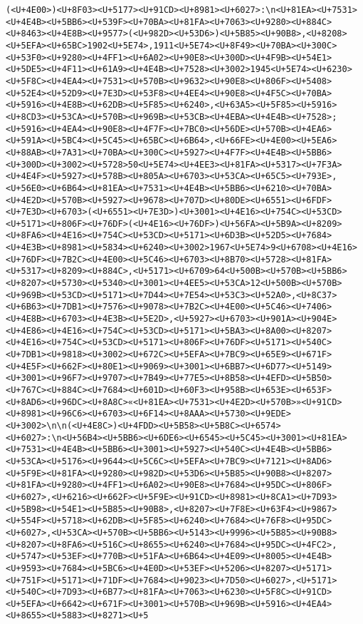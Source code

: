 \documentclass[
]{article}
\begin{document}
\begin{verbatim}
(<U+4E00>)<U+8F03><U+5177><U+91CD><U+8981><U+6027>:\n<U+81EA><U+7531><U+4E4B><U+5BB6><U+539F><U+70BA><U+81FA><U+7063><U+9280><U+884C><U+8463><U+4E8B><U+9577>(<U+982D><U+53D6>)<U+5B85><U+90B8>,<U+8208><U+5EFA><U+65BC>1902<U+5E74>,1911<U+5E74><U+8F49><U+70BA><U+300C><U+53F0><U+9280><U+4FF1><U+6A02><U+90E8><U+300D><U+4F9B><U+54E1><U+5DE5><U+4F11><U+61A9><U+4E4B><U+7528><U+3002>1945<U+5E74><U+6230><U+5F8C><U+4EA4><U+7531><U+570B><U+9632><U+90E8><U+806F><U+5408><U+52E4><U+52D9><U+7E3D><U+53F8><U+4EE4><U+90E8><U+4F5C><U+70BA><U+5916><U+4E8B><U+62DB><U+5F85><U+6240>,<U+63A5><U+5F85><U+5916><U+8CD3><U+53CA><U+570B><U+969B><U+53CB><U+4EBA><U+4E4B><U+7528>;<U+5916><U+4EA4><U+90E8><U+4F7F><U+7BC0><U+56DE><U+570B><U+4EA6><U+591A><U+5BC4><U+5C45><U+65BC><U+6B64>,<U+66FE><U+4E00><U+5EA6><U+88AB><U+7A31><U+70BA><U+300C><U+5927><U+4F7F><U+4E4B><U+5BB6><U+300D><U+3002><U+5728>50<U+5E74><U+4EE3><U+81FA><U+5317><U+7F3A><U+4E4F><U+5927><U+578B><U+805A><U+6703><U+53CA><U+65C5><U+793E>,<U+56E0><U+6B64><U+81EA><U+7531><U+4E4B><U+5BB6><U+6210><U+70BA><U+4E2D><U+570B><U+5927><U+9678><U+707D><U+80DE><U+6551><U+6FDF><U+7E3D><U+6703>(<U+6551><U+7E3D>)<U+3001><U+4E16><U+754C><U+53CD><U+5171><U+806F><U+76DF>(<U+4E16><U+76DF>)<U+56FA><U+5B9A><U+8209><U+8FA6><U+4E16><U+754C><U+53CD><U+5171><U+6D3B><U+52D5><U+7684><U+4E3B><U+8981><U+5834><U+6240><U+3002>1967<U+5E74>9<U+6708><U+4E16><U+76DF><U+7B2C><U+4E00><U+5C46><U+6703><U+8B70><U+5728><U+81FA><U+5317><U+8209><U+884C>,<U+5171><U+6709>64<U+500B><U+570B><U+5BB6><U+8207><U+5730><U+5340><U+3001><U+4EE5><U+53CA>12<U+500B><U+570B><U+969B><U+53CD><U+5171><U+7D44><U+7E54><U+53C3><U+52A0>,<U+8C37><U+6B63><U+7DB1><U+7576><U+9078><U+7B2C><U+4E00><U+5C46><U+7406><U+4E8B><U+6703><U+4E3B><U+5E2D>,<U+5927><U+6703><U+901A><U+904E><U+4E86><U+4E16><U+754C><U+53CD><U+5171><U+5BA3><U+8A00><U+8207><U+4E16><U+754C><U+53CD><U+5171><U+806F><U+76DF><U+5171><U+540C><U+7DB1><U+9818><U+3002><U+672C><U+5EFA><U+7BC9><U+65E9><U+671F><U+4E5F><U+662F><U+80E1><U+9069><U+3001><U+6BB7><U+6D77><U+5149><U+3001><U+96F7><U+9707><U+7B49><U+77E5><U+8B58><U+4EFD><U+5B50><U+767C><U+884C><U+7684><U+601D><U+60F3><U+958B><U+653E><U+653F><U+8AD6><U+96DC><U+8A8C>«<U+81EA><U+7531><U+4E2D><U+570B>»<U+91CD><U+8981><U+96C6><U+6703><U+6F14><U+8AAA><U+5730><U+9EDE><U+3002>\n\n(<U+4E8C>)<U+4FDD><U+5B58><U+5B8C><U+6574><U+6027>:\n<U+56B4><U+5BB6><U+6DE6><U+6545><U+5C45><U+3001><U+81EA><U+7531><U+4E4B><U+5BB6><U+3001><U+5927><U+540C><U+4E4B><U+5BB6><U+53CA><U+5176><U+9644><U+5C6C><U+5EFA><U+7BC9><U+7121><U+8AD6><U+5F9E><U+81FA><U+9280><U+982D><U+53D6><U+5B85><U+90B8><U+8207><U+81FA><U+9280><U+4FF1><U+6A02><U+90E8><U+7684><U+95DC><U+806F><U+6027>,<U+6216><U+662F><U+5F9E><U+91CD><U+8981><U+8CA1><U+7D93><U+5B98><U+54E1><U+5B85><U+90B8>,<U+8207><U+7F8E><U+63F4><U+9867><U+554F><U+5718><U+62DB><U+5F85><U+6240><U+7684><U+76F8><U+95DC><U+6027>,<U+53CA><U+570B><U+5BB6><U+5143><U+9996><U+5B85><U+90B8><U+8207><U+8FA6><U+516C><U+8655><U+6240><U+7684><U+95DC><U+4FC2>,<U+5747><U+53EF><U+770B><U+51FA><U+6B64><U+4E09><U+8005><U+4E4B><U+9593><U+7684><U+5BC6><U+4E0D><U+53EF><U+5206><U+8207><U+5171><U+751F><U+5171><U+71DF><U+7684><U+9023><U+7D50><U+6027>,<U+5171><U+540C><U+7D93><U+6B77><U+81FA><U+7063><U+6230><U+5F8C><U+91CD><U+5EFA><U+6642><U+671F><U+3001><U+570B><U+969B><U+5916><U+4EA4><U+8655><U+5883><U+8271><U+5
\end{verbatim}
\end{document}

